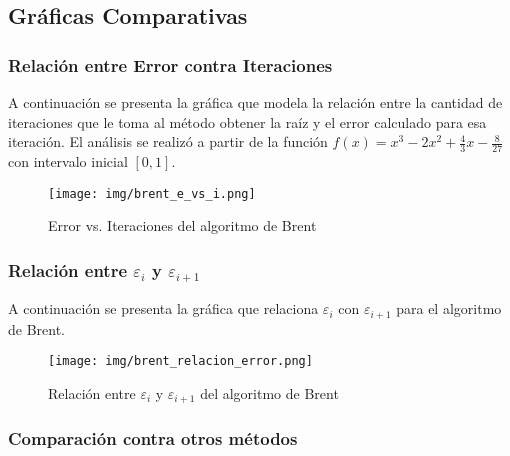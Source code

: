 \documentclass[a4paper,12pt]{article}
\begin{document}
\newpage

\subsection{Gráficas Comparativas}

\subsubsection{Relación entre Error contra Iteraciones}

A continuación se presenta la gráfica que modela la relación entre la cantidad de iteraciones que le toma al método obtener la raíz y el error calculado para esa iteración. El análisis se realizó a partir de la función $f(x)=x^3-2x^2+\frac{4}{3}x-\frac{8}{27}$ con intervalo inicial $[0,1]$. \par

\vspace{-2em}
\begin{figure}[ht!]
\centering
\texttt{[image: img/brent\_e\_vs\_i.png]}
\vspace{-1em}
\caption{Error vs. Iteraciones del algoritmo de Brent}
\label{fig:brent_e_i}
\end{figure}

\vspace{-1em}

\subsubsection{Relación entre $\varepsilon_i$ y $\varepsilon_{i+1}$}

A continuación se presenta la gráfica que relaciona $\varepsilon_i$ con $\varepsilon_{i+1}$ para el algoritmo de Brent. \par

\vspace{-1em}
\begin{figure}[ht!]
\centering
\texttt{[image: img/brent\_relacion\_error.png]}
\vspace{-1em}
\caption{Relación entre $\varepsilon_i$ y $\varepsilon_{i+1}$ del algoritmo de Brent}
\label{fig:relacion_error_brent}
\end{figure}

\newpage

\subsubsection{Comparación contra otros métodos}
\end{document}

